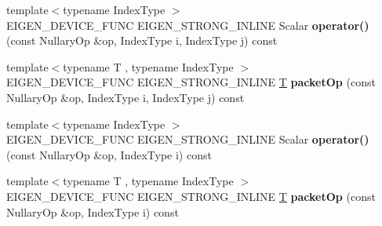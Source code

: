 \begin{DoxyCompactItemize}
\item 
\mbox{\label{struct_eigen_1_1internal_1_1nullary__wrapper_3_01_scalar_00_01_nullary_op_00_01false_00_01true_00_01false_01_4_a890b377218120aa98a869849ea42e216}} 
{\footnotesize template$<$typename Index\+Type $>$ }\\E\+I\+G\+E\+N\+\_\+\+D\+E\+V\+I\+C\+E\+\_\+\+F\+U\+NC E\+I\+G\+E\+N\+\_\+\+S\+T\+R\+O\+N\+G\+\_\+\+I\+N\+L\+I\+NE Scalar {\bfseries operator()} (const Nullary\+Op \&op, Index\+Type i, Index\+Type j) const
\item 
\mbox{\label{struct_eigen_1_1internal_1_1nullary__wrapper_3_01_scalar_00_01_nullary_op_00_01false_00_01true_00_01false_01_4_a7a489ac076fd07813a207e486f96cd3b}} 
{\footnotesize template$<$typename T , typename Index\+Type $>$ }\\E\+I\+G\+E\+N\+\_\+\+D\+E\+V\+I\+C\+E\+\_\+\+F\+U\+NC E\+I\+G\+E\+N\+\_\+\+S\+T\+R\+O\+N\+G\+\_\+\+I\+N\+L\+I\+NE \hyperlink{group___sparse_core___module}{T} {\bfseries packet\+Op} (const Nullary\+Op \&op, Index\+Type i, Index\+Type j) const
\item 
\mbox{\label{struct_eigen_1_1internal_1_1nullary__wrapper_3_01_scalar_00_01_nullary_op_00_01false_00_01true_00_01false_01_4_a31aa5cfef4f7d0fd7828da74f8960c6e}} 
{\footnotesize template$<$typename Index\+Type $>$ }\\E\+I\+G\+E\+N\+\_\+\+D\+E\+V\+I\+C\+E\+\_\+\+F\+U\+NC E\+I\+G\+E\+N\+\_\+\+S\+T\+R\+O\+N\+G\+\_\+\+I\+N\+L\+I\+NE Scalar {\bfseries operator()} (const Nullary\+Op \&op, Index\+Type i) const
\item 
\mbox{\label{struct_eigen_1_1internal_1_1nullary__wrapper_3_01_scalar_00_01_nullary_op_00_01false_00_01true_00_01false_01_4_aedb76f03614fc386b2a8c8121476cdc6}} 
{\footnotesize template$<$typename T , typename Index\+Type $>$ }\\E\+I\+G\+E\+N\+\_\+\+D\+E\+V\+I\+C\+E\+\_\+\+F\+U\+NC E\+I\+G\+E\+N\+\_\+\+S\+T\+R\+O\+N\+G\+\_\+\+I\+N\+L\+I\+NE \hyperlink{group___sparse_core___module}{T} {\bfseries packet\+Op} (const Nullary\+Op \&op, Index\+Type i) const
\end{DoxyCompactItemize}


